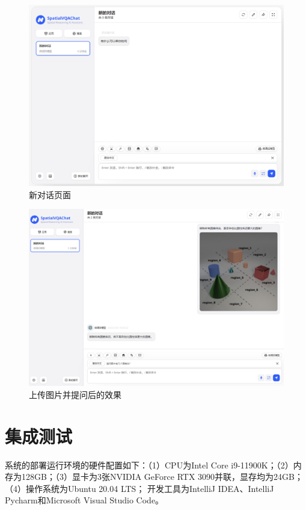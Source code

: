 \begin{figure}[h]
    \centering
    \includegraphics[scale=0.35]{figures/frontend-welcome-page.png}
    \caption{新对话页面}
    \label{fig:welcome-page}
\end{figure}
\begin{figure}[h]
    \centering
    \includegraphics[scale=0.3]{figures/question.png}
    \caption{上传图片并提问后的效果}
    \label{fig:question}
\end{figure}

\section{集成测试}
系统的部署运行环境的硬件配置如下：（1）CPU为Intel Core i9-11900K；（2）内存为128GB；（3）显卡为3张NVIDIA GeForce RTX 3090并联，显存均为24GB；（4）操作系统为Ubuntu 20.04 LTS；
开发工具为IntelliJ IDEA、IntelliJ Pycharm和Microsoft Visual Studio Code。

